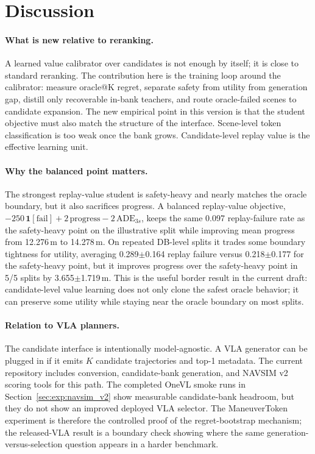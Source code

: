 \documentclass{article}
\begin{document}
\section{Discussion}
\label{sec:discussion}

\paragraph{What is new relative to reranking.}
A learned value calibrator over candidates is not enough by itself; it is close to
standard reranking. The contribution here is the training loop around the calibrator:
measure oracle@K regret, separate safety from utility from generation gap, distill only
recoverable in-bank teachers, and route oracle-failed scenes to candidate expansion. The
new empirical point in this version is that the student objective must also match the
structure of the interface. Scene-level token classification is too weak once the bank
grows. Candidate-level replay value is the effective learning unit.

\paragraph{Why the balanced point matters.}
The strongest replay-value student is safety-heavy and nearly matches the oracle boundary,
but it also sacrifices progress. A balanced replay-value objective,
$-250\,\mathbf{1}[\text{fail}] + 2\,\text{progress} - 2\,\text{ADE}_{3s}$, keeps the same
0.097 replay-failure rate as the safety-heavy point on the illustrative split while
improving mean progress from 12.276\,m to 14.278\,m. On repeated DB-level splits it
trades some boundary tightness for utility, averaging 0.289$\pm$0.164 replay failure
versus 0.218$\pm$0.177 for the safety-heavy point, but it improves progress over the
safety-heavy point in 5/5 splits by 3.655$\pm$1.719\,m. This is the useful border result
in the current draft: candidate-level value learning does not only clone the safest
oracle behavior; it can preserve some utility while staying near the oracle boundary on
most splits.

\paragraph{Relation to VLA planners.}
The candidate interface is intentionally model-agnostic. A VLA generator can be plugged in
if it emits $K$ candidate trajectories and top-1 metadata. The current repository includes
conversion, candidate-bank generation, and NAVSIM v2 scoring tools for this path. The
completed OneVL smoke runs in Section~\ref{sec:exp:navsim_v2} show measurable
candidate-bank headroom, but they do not show an improved deployed VLA selector. The
ManeuverToken experiment is therefore the controlled proof of the regret-bootstrap
mechanism; the released-VLA result is a boundary check showing where the same
generation-versus-selection question appears in a harder benchmark.
\end{document}
